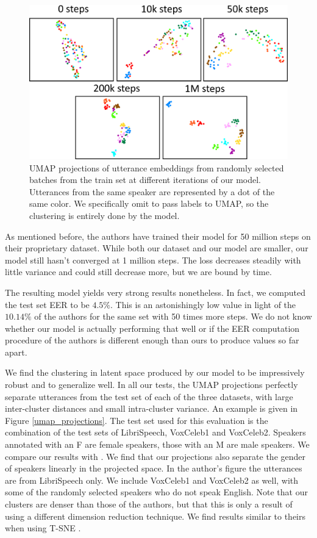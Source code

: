 \documentclass[a4paper, oneside, 12pt, english]{article}
\begin{document}
\begin{figure}[h]
	\centering
	\includegraphics[width=\linewidth]{images/training_umap.png}
	\caption{UMAP projections of utterance embeddings from randomly selected batches from the train set at different iterations of our model. Utterances from the same speaker are represented by a dot of the same color. We specifically omit to pass labels to UMAP, so the clustering is entirely done by the model.}
	\label{training_umap}
\end{figure}

As mentioned before, the authors have trained their model for 50 million steps on their proprietary dataset. While both our dataset and our model are smaller, our model still hasn't converged at 1 million steps. The loss decreases steadily with little variance and could still decrease more, but we are bound by time. 

The resulting model yields very strong results nonetheless. In fact, we computed the test set EER to be $\mathbf{4.5\%}$. This is an astonishingly low value in light of the $10.14\%$ of the authors for the same set with 50 times more steps. We do not know whether our model is actually performing that well or if the EER computation procedure of the authors is different enough than ours to produce values so far apart.

We find the clustering in latent space produced by our model to be impressively robust and to generalize well. In all our tests, the UMAP projections perfectly separate utterances from the test set of each of the three datasets, with large inter-cluster distances and small intra-cluster variance. An example is given in Figure \ref{umap_projections}. The test set used for this evaluation is the combination of the test sets of LibriSpeech, VoxCeleb1 and VoxCeleb2. Speakers annotated with an F are female speakers, those with an M are male speakers. We compare our results with \citep[Figure 3]{SV2TTS}. We find that our projections also separate the gender of speakers linearly in the projected space. In the author's figure the utterances are from LibriSpeech only. We include VoxCeleb1 and VoxCeleb2 as well, with some of the randomly selected speakers who do not speak English. Note that our clusters are denser than those of the authors, but that this is only a result of using a different dimension reduction technique. We find results similar to theirs when using T-SNE \citep{TSNE}.
\end{document}

